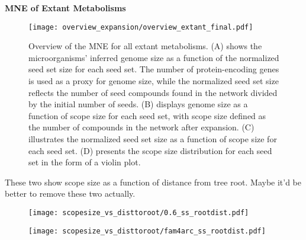 \vspace{0.5cm}
\textbf{MNE of Extant Metabolisms}

\begin{figure}[H]
    \centering
    \texttt{[image: overview\_expansion/overview\_extant\_final.pdf]}
    \caption{Overview of the MNE for all extant metabolisms. (A) shows the microorganisms' inferred genome size as a function of the normalized seed set size for each seed set. The number of protein-encoding genes is used as a proxy for genome size, while the normalized seed set size reflects the number of seed compounds found in the network divided by the initial number of seeds. (B) displays genome size as a function of scope size for each seed set, with scope size defined as the number of compounds in the network after expansion. (C) illustrates the normalized seed set size as a function of scope size for each seed set. (D) presents the scope size distribution for each seed set in the form of a violin plot.}
    \label{overview_extant}
\end{figure}   

These two show scope size as a function of distance from tree root. Maybe it'd be better to remove these two actually.

\begin{figure}[H]
    \centering
    \texttt{[image: scopesize\_vs\_disttoroot/0.6\_ss\_rootdist.pdf]}
    \caption{}
    \label{0.6_scopesize}
\end{figure}   

\begin{figure}[H]
    \centering
    \texttt{[image: scopesize\_vs\_disttoroot/fam4arc\_ss\_rootdist.pdf]}
    \caption{}
    \label{fam_scopesize}
\end{figure}   
